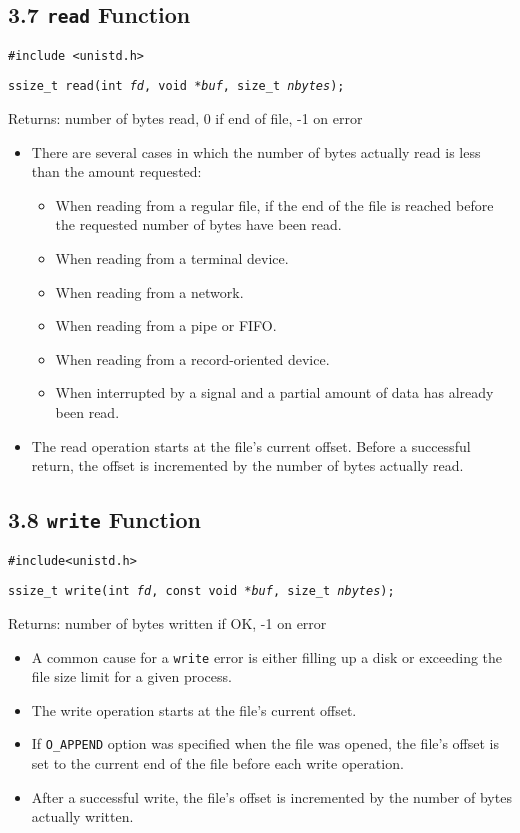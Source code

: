 \documentclass[]{article}
\newcommand{\code}{\texttt}
\begin{document}
\subsection*{3.7 \code{read} Function}
\code{\#include <unistd.h>}

\code{ssize\_t read(int \emph{fd}, void *\emph{buf}, size\_t \emph{nbytes});}

Returns: number of bytes read, 0 if end of file, -1 on error

\begin{itemize}
\item There are several cases in which the number of bytes actually read is less
than the amount requested:
\begin{itemize}
\item When reading from a regular file, if the end of the file is reached before
the requested number of bytes have been read.
\item When reading from a terminal device.
\item When reading from a network.
\item When reading from a pipe or FIFO.
\item When reading from a record-oriented device.
\item When interrupted by a signal and a partial amount of data has already been
read.
\end{itemize}
\item The read operation starts at the file's current offset. Before a
successful return, the offset is incremented by the number of bytes actually
read.
\end{itemize}

\subsection*{3.8 \code{write} Function}
\code{\#include<unistd.h>}

\code{ssize\_t write(int \emph{fd}, const void *\emph{buf}, size\_t
\emph{nbytes});}

Returns: number of bytes written if OK, -1 on error

\begin{itemize}
\item A common cause for a \code{write} error is either filling up a disk or
exceeding the file size limit for a given process.
\item The write operation starts at the file's current offset.
\item If \code{O\_APPEND} option was specified when the file was opened, the
file's offset is set to the current end of the file before each write operation.
\item After a successful write, the file's offset is incremented by the number
of bytes actually written.
\end{itemize}
\end{document}
